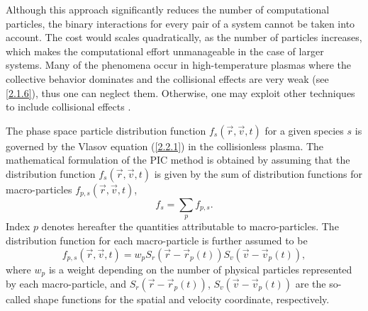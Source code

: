 Although this approach significantly reduces the number of computational particles, the binary interactions for every pair of a system cannot be taken into account. The cost would scales quadratically, as the number of particles increases, which makes the computational effort unmanageable in the case of larger systems. Many of the phenomena occur in high-temperature plasmas where the collective behavior dominates and the collisional effects are very weak (see \ref{2.1.6}), thus one can neglect them. Otherwise, one may exploit other techniques to include collisional effects \cite{lapenta}.

The phase space particle distribution function  $ f_{s} \left(\vec{r}, \vec{v}, t\right) $ for a given species $ s $ is governed by the Vlasov equation (\ref{2.2.1}) in the collisionless plasma. The mathematical formulation of the PIC method is obtained by assuming that the distribution function $ f_{s} \left(\vec{r}, \vec{v}, t\right) $ is given by the sum of distribution functions for macro-particles $ f_{p, s} \left(\vec{r}, \vec{v}, t\right) $,
\begin{equation}
\label{3.1.1}
f_{s} =  \sum_{p} f_{p, s}.
\end{equation}
Index $ p $ denotes hereafter the quantities attributable to macro-particles. The distribution function for each macro-particle is further assumed to be
\begin{equation}
\label{3.1.2}
f_{p, s}\left(\vec{r}, \vec{v}, t \right) = w_{p} S_{r}\left(\vec{r} - \vec{r}_{p}\left(t\right) \right)  S_{v}\left(\vec{v} - \vec{v}_{p}\left( t\right) \right),
\end{equation}
where $ w_{p} $ is a weight depending on the number of physical particles represented by each macro-particle, and $ S_{r}\left(\vec{r} - \vec{r}_{p}\left(t\right) \right) $, $ S_{v}\left(\vec{v} - \vec{v}_{p}\left(t\right) \right) $ are the so-called shape functions for the spatial and velocity coordinate, respectively.


